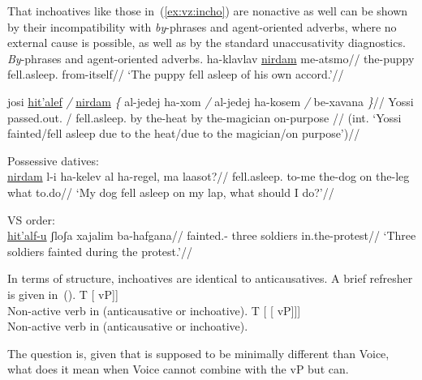 {That inchoatives like those in~(\ref{ex:vz:incho}) are nonactive as well can be shown by their incompatibility with \emph{by}-phrases and agent-oriented adverbs, where no external cause is possible, as well as by the standard unaccusativity diagnostics.
\pex \emph{By}-phrases and agent-oriented adverbs.
		\a \begingl
		\gla ha-klavlav \underline{nirdam} me-atsmo//
		\glb the-puppy fell.asleep. from-itself//
		\glft `The puppy fell asleep of his own accord.'//
		\endgl
		
		\a \ljudge{*} \begingl
			\gla josi \underline{hit'alef} \emph{/} \underline{nirdam} \emph{\{} al-jedej ha-xom \emph{/} al-jedej ha-kosem \emph{/} be-xavana \emph{\}}//
			\glb Yossi passed.out. / fell.asleep. {} by the-heat {} by the-magician {} on-purpose {}//
			\glft (int. `Yossi fainted/fell asleep due to the heat/due to the magician/on purpose')//
		\endgl
\xe


\ex Possessive datives:\\
	\begingl
	\gla \underline{nirdam} l-i ha-kelev al ha-regel, ma laasot?//
	\glb fell.asleep. to-me the-dog on the-leg what to.do//
	\glft `My dog fell asleep on my lap, what should I do?'//
	\endgl
\xe

\ex VS order:\\
	\begingl
	\gla \underline{hit'alf-u} ʃloʃa xajalim ba-hafgana//
	\glb fainted.- three soldiers in.the-protest//
	\glft `Three soldiers fainted during the protest.'//
	\endgl
\xe

In terms of structure, inchoatives are identical to anticausatives. A brief refresher is given in~(\nextx).
\pex
	\a {[}T [{\vz} vP]]\\
	Non-active verb in {\tnif} (anticausative or inchoative).
	\a {[}T [{\vz} [{\va} vP]]]\\
	Non-active verb in {\thit} (anticausative or inchoative).
\xe

The question is, given that {\vz} is supposed to be minimally different than Voice, what does it mean when Voice cannot combine with the vP but {\vz} can.

}
